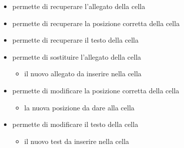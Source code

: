 \begin{itemize}
\item {}
\newline
permette di recuperare l'allegato della cella
\newline
\item {}
\newline
permette di recuperare la posizione corretta della cella
\newline
\item {}
\newline
permette di recuperare il testo della cella
\newline
\item {}
\newline
permette di sostituire l'allegato della cella
\newline
{}
\newline
\begin{itemize}
\item {}
\newline
il nuovo allegato da inserire nella cella
\end{itemize}
\item {}
\newline
permette di modificare la posizione corretta della cella
\newline
{}
\newline
\begin{itemize}
\item {}
\newline
la nuova posizione da dare alla cella
\end{itemize}
\item {}
\newline
permette di modificare il testo della cella
\newline
{}
\newline
\begin{itemize}
\item {}
\newline
il nuovo test da inserire nella cella
\end{itemize}
\end{itemize}
